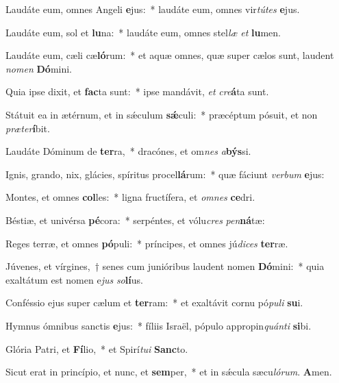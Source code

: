 Laudáte eum, omnes Angeli \textbf{e}jus:~* laudáte eum, omnes vir\textit{tú}\textit{tes} \textbf{e}jus.

Laudáte eum, sol et \textbf{lu}na:~* laudáte eum, omnes stel\textit{læ} \textit{et} \textbf{lu}men.

Laudáte eum, cæli cæ\textbf{ló}rum:~* et aquæ omnes, quæ super cælos sunt, laudent \textit{no}\textit{men} \textbf{Dó}mini.

Quia ipse dixit, et \textbf{fac}ta sunt:~* ipse mandávit, \textit{et} \textit{cre}\textbf{á}ta sunt.

Státuit ea in ætérnum, et in sǽculum \textbf{sǽ}culi:~* præcéptum pósuit, et non \textit{præ}\textit{ter}\textbf{í}bit.

Laudáte Dóminum de \textbf{ter}ra,~* dracónes, et om\textit{nes} \textit{a}\textbf{býs}si.

Ignis, grando, nix, glácies, spíritus procel\textbf{lá}rum:~* quæ fáciunt \textit{ver}\textit{bum} \textbf{e}jus:

Montes, et omnes \textbf{col}les:~* ligna fructífera, et \textit{om}\textit{nes} \textbf{ce}dri.

Béstiæ, et univérsa \textbf{pé}cora:~* serpéntes, et vólu\textit{cres} \textit{pen}\textbf{ná}tæ:

Reges terræ, et omnes \textbf{pó}puli:~* príncipes, et omnes jú\textit{di}\textit{ces} \textbf{ter}ræ.

Júvenes, et vírgines,~† senes cum junióribus laudent nomen \textbf{Dó}mini:~* quia exaltátum est nomen e\textit{jus} \textit{so}\textbf{lí}us.

Conféssio ejus super cælum et \textbf{ter}ram:~* et exaltávit cornu pó\textit{pu}\textit{li} \textbf{su}i.

Hymnus ómnibus sanctis \textbf{e}jus:~* fíliis Israël, pópulo appropin\textit{quán}\textit{ti} \textbf{si}bi.

Glória Patri, et \textbf{Fí}lio,~* et Spirí\textit{tu}\textit{i} \textbf{Sanc}to.

Sicut erat in princípio, et nunc, et \textbf{sem}per,~* et in sǽcula sæcu\textit{ló}\textit{rum}. \textbf{A}men.

